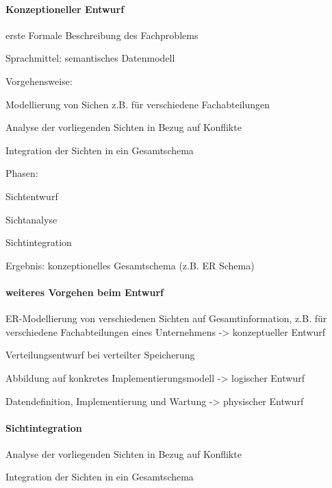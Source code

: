 \documentclass[a4paper]{article}
\begin{document}
\begin{multicols}{3}
\paragraph{Konzeptioneller Entwurf}
\begin{itemize*}
    \item erste Formale Beschreibung des Fachproblems
    \item Sprachmittel: semantisches Datenmodell
    \item Vorgehensweise:
    \begin{itemize*}
        \item Modellierung von Sichen z.B. für verschiedene Fachabteilungen
        \item Analyse der vorliegenden Sichten in Bezug auf Konflikte
        \item Integration der Sichten in ein Gesamtschema
    \end{itemize*}
    \item Phasen:
    \begin{itemize*}
        \item Sichtentwurf
        \item Sichtanalyse
        \item Sichtintegration
    \end{itemize*}
    \item Ergebnis: konzeptionelles Gesamtschema (z.B. ER Schema)
\end{itemize*}

\paragraph{weiteres Vorgehen beim Entwurf}
\begin{itemize*}
    \item ER-Modellierung von verschiedenen Sichten auf Gesamtinformation, z.B. für verschiedene Fachabteilungen eines Unternehmens -> konzeptueller Entwurf
    \item Verteilungsentwurf bei verteilter Speicherung
    \item Abbildung auf konkretes Implementierungsmodell -> logischer Entwurf
    \item Datendefinition, Implementierung und Wartung -> physischer Entwurf
\end{itemize*}

\paragraph{Sichtintegration}
\begin{itemize*}
    \item Analyse der vorliegenden Sichten in Bezug auf Konflikte
    \item Integration der Sichten in ein Gesamtschema
\end{itemize*}


\end{multicols}
\end{document}
